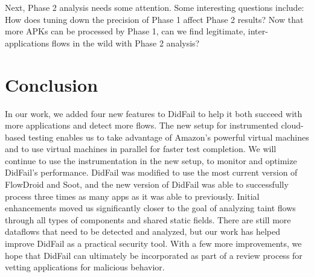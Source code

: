 Next, Phase 2 analysis needs some attention.  Some interesting questions include: How does tuning down the precision of Phase 1 affect Phase 2 results?  Now that more APKs can be processed by Phase 1, can we find legitimate, inter-applications flows in the wild with Phase 2 analysis?

\section{Conclusion}

In our work, we added four new features to DidFail to help it both succeed with more applications and detect more flows. 
 The new setup for instrumented cloud-based testing enables us to take advantage of Amazon's powerful virtual machines and to use virtual machines in parallel for faster test completion. We will continue to use the instrumentation in the new setup, to monitor and optimize DidFail's performance. DidFail was modified to use the most current version of FlowDroid and Soot, and the new version of DidFail was able to successfully process three times as many apps as it was able to previously. Initial enhancements moved us significantly closer to the goal of analyzing taint flows through all types of components and shared static fields.
There are still more dataflows that need to be detected and analyzed, but our work has helped improve DidFail as a practical security tool. With a few more improvements, we hope that DidFail can ultimately be incorporated as part of a review process for vetting applications for malicious behavior.


%




